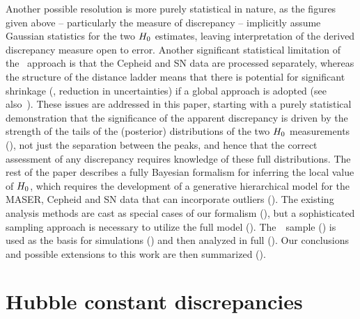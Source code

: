 \documentclass[a4paper,fleqn,usenatbib]{mnras}
\newcommand{\riess}{\citetalias{Riess_etal:2016}}
\begin{document}
{Another possible resolution is more purely statistical in nature, 
as the figures given above -- particularly the measure of discrepancy -- 
implicitly assume Gaussian statistics for the two $H_0$ estimates,
leaving interpretation of the derived discrepancy measure open to error.
Another significant statistical limitation of the \riess\ approach
is that the Cepheid and SN data are processed separately, 
whereas the structure of the distance ladder means that 
there is potential for significant shrinkage (\ie, reduction in 
uncertainties) if a global approach is adopted (see also~\citet{Zhang_etal:2017}).
These issues are addressed in this paper, 
starting with a purely statistical demonstration that the significance 
of the apparent discrepancy is driven by the 
strength of the tails of the (posterior)
distributions of the two $H_0$ measurements (),
not just the separation between the peaks, 
and hence that the correct assessment of any discrepancy requires 
knowledge of these full distributions.
The rest of the paper describes a fully Bayesian formalism
for inferring the local value of $H_0$,
which requires the development of a generative 
hierarchical model for the 
MASER, Cepheid and SN data that can incorporate outliers ().
The existing analysis methods are cast as special cases of our
formalism (), 
but a sophisticated sampling approach is necessary to utilize the full model (). The~\riess\ 
sample () is used as the basis for simulations () and then analyzed in full ().  Our conclusions and possible extensions to this work are then summarized ().


\section{Hubble constant discrepancies}
\label{section:stats}

}
\end{document}
